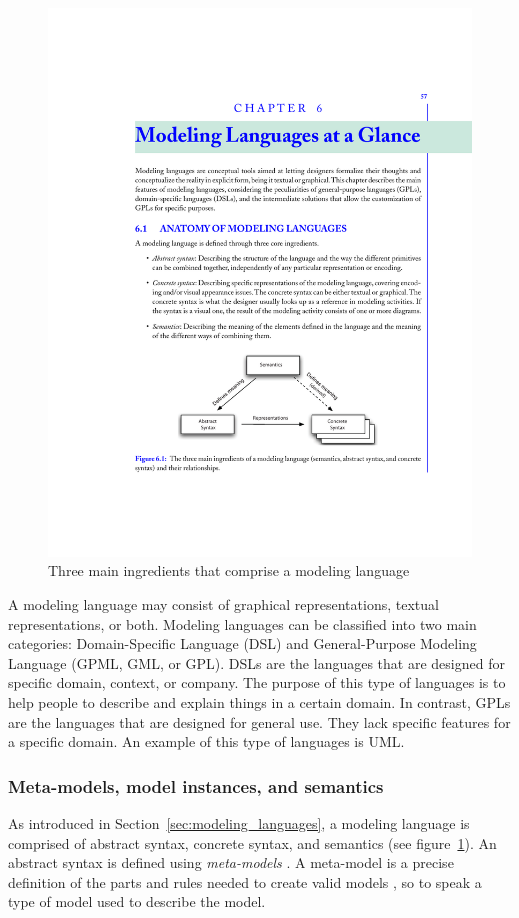 \begin{figure}[H]
\centering
\captionsetup{justification=centering}
\vspace{0cm}%
\includegraphics[width=0.6\linewidth]{figure/literatures/brambilla_modeling.pdf}
\caption{Three main ingredients that comprise a modeling language \cite{Brambilla}}
\label{fig:brambilla-modeling}
\end{figure}

A modeling language may consist of graphical representations, textual representations, or both. Modeling languages can be classified into two main categories: Domain-Specific Language (DSL) and General-Purpose Modeling Language (GPML, GML, or GPL). DSLs are the languages that are designed for specific domain, context, or company. The purpose of this type of languages is to help people to describe and explain things in a certain domain. In contrast, GPLs are the languages that are designed for general use. They lack specific features for a specific domain. An example of this type of languages is UML. \\

\subsubsection{Meta-models, model instances, and semantics}
As introduced in Section~\ref{sec:modeling_languages}, a modeling language is comprised of abstract syntax, concrete syntax, and semantics (see figure~\ref{fig:brambilla-modeling}). An abstract syntax is defined using \textit{meta-models} \cite{Brambilla}. A meta-model is a precise definition of the parts and rules needed to create valid models \cite{Tichy}, so to speak a type of model used to describe the model.\\

